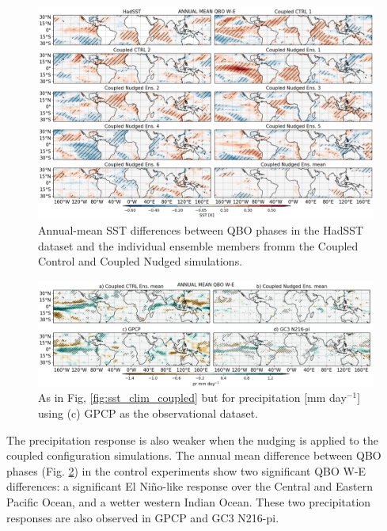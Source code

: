 \begin{figure}[t!]
\centering
 \includegraphics[width=\linewidth]{figures/sst_check_climqbowqboe.png}
\caption[SST response in MAM to the QBO in coupled nudged experiments]{Annual-mean SST differences between QBO phases in the HadSST dataset and the individual ensemble members fromm the Coupled Control and Coupled Nudged simulations.}
\label{fig:sst_ens}
\end{figure}



\begin{figure}[t!]
\centering
 \includegraphics[width=\linewidth]{figures/prseasonal_climqbowqboe.png}
\caption[Annual mean SST response to the QBO in coupled nudged experiments]{ As in Fig, \ref{fig:sst_clim_coupled} but for precipitation [mm day$^{-1}$] using (c) GPCP as the observational dataset.}
\label{fig:pr_clim_coupled}
\end{figure}

The precipitation response is also weaker when the nudging is applied to the coupled 
configuration simulations. The annual mean difference between QBO phases (Fig. \ref{fig:pr_clim_coupled}) in the control experiments show two significant QBO W-E differences: a significant El Niño-like response over the Central and Eastern Pacific Ocean, and a wetter western Indian Ocean. These two precipitation responses are also observed in GPCP and GC3 N216-pi. 

